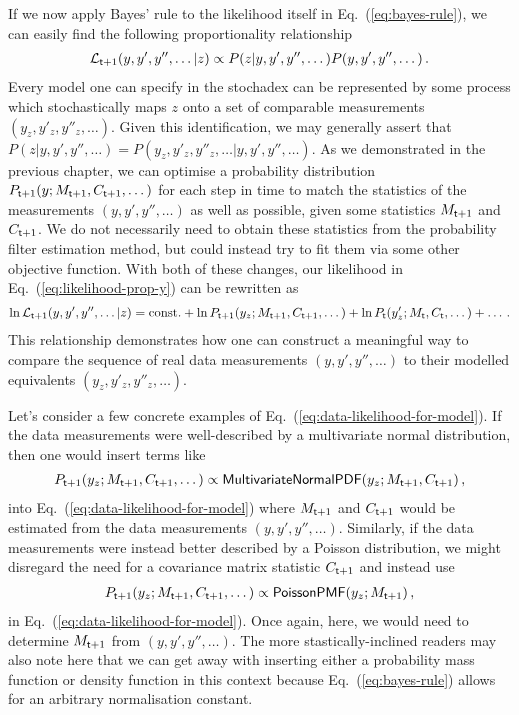 If we now apply Bayes' rule to the likelihood itself in Eq.~(\ref{eq:bayes-rule}), we can easily find the following proportionality relationship
\begin{align}
{\cal L}_{{\sf t}+1}(y, y',y'', \dots\vert z) \propto P(z\vert y, y',y'', \dots)P(y, y',y'', \dots) \label{eq:likelihood-prop-y}\,.
\end{align}
Every model one can specify in the stochadex can be represented by some process which stochastically maps $z$ onto a set of comparable measurements $(y_z, y'_z,y''_z, \dots)$. Given this identification, we may generally assert that $P(z\vert y, y',y'', \dots)=P(y_z, y'_z,y''_z, \dots\vert y, y',y'', \dots)$. As we demonstrated in the previous chapter, we can optimise a probability distribution $P_{{\sf t}+1}(y;M_{{\sf t}+1},C_{{\sf t}+1}, \dots)$ for each step in time to match the statistics of the measurements $(y, y', y'', \dots)$ as well as possible, given some statistics $M_{{\sf t}+1}$ and $C_{{\sf t}+1}$. We do not necessarily need to obtain these statistics from the probability filter estimation method, but could instead try to fit them via some other objective function. With both of these changes, our likelihood in Eq.~(\ref{eq:likelihood-prop-y}) can be rewritten as
\begin{align}
\ln {\cal L}_{{\sf t}+1}(y, y',y'', \dots\vert z) = {\rm const.} + \ln P_{{\sf t}+1}(y_z;M_{{\sf t}+1},C_{{\sf t}+1},\dots ) + \ln P_{{\sf t}}(y'_z;M_{{\sf t}},C_{{\sf t}},\dots ) + \dots \label{eq:data-likelihood-for-model} \,.
\end{align}
This relationship demonstrates how one can construct a meaningful way to compare the sequence of real data measurements $(y, y', y'', \dots)$ to their modelled equivalents $(y_z, y'_z, y''_z, \dots)$.

Let's consider a few concrete examples of Eq.~(\ref{eq:data-likelihood-for-model}). If the data measurements were well-described by a multivariate normal distribution, then one would insert terms like
\begin{align}
P_{{\sf t}+1}(y_z;M_{{\sf t}+1},C_{{\sf t}+1},\dots ) \propto {\sf MultivariateNormalPDF}(y_z;M_{{\sf t}+1},C_{{\sf t}+1})\,,
\end{align}
into Eq.~(\ref{eq:data-likelihood-for-model}) where $M_{{\sf t}+1}$ and $C_{{\sf t}+1}$ would be estimated from the data measurements $(y, y', y'', \dots)$. Similarly, if the data measurements were instead better described by a Poisson distribution, we might disregard the need for a covariance matrix statistic $C_{{\sf t}+1}$ and instead use
\begin{align}
P_{{\sf t}+1}(y_z;M_{{\sf t}+1},C_{{\sf t}+1},\dots ) \propto {\sf PoissonPMF}(y_z;M_{{\sf t}+1})\,,
\end{align}
in Eq.~(\ref{eq:data-likelihood-for-model}). Once again, here, we would need to determine $M_{{\sf t}+1}$ from $(y, y', y'', \dots)$. The more stastically-inclined readers may also note here that we can get away with inserting either a probability mass function or density function in this context because Eq.~(\ref{eq:bayes-rule}) allows for an arbitrary normalisation constant.

